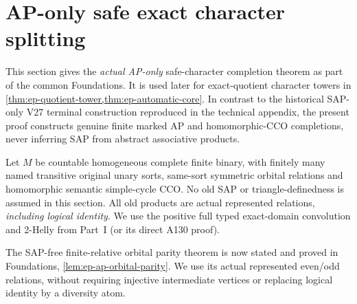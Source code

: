 \section{AP-only safe exact character splitting}
\label{sec:ep-ap-only-safe-character}

This section gives the \emph{actual AP-only} safe-character
completion theorem as part of the common Foundations.
It is used later for exact-quotient character towers in
\cref{thm:ep-quotient-tower,thm:ep-automatic-core}.
In contrast to the historical SAP-only V27 terminal
construction reproduced in the technical appendix,
the present proof constructs genuine finite marked
AP and homomorphic-CCO completions, never inferring
SAP from abstract associative products.

Let \(M\) be countable homogeneous complete finite binary,
with finitely many named transitive original unary sorts,
same-sort symmetric orbital relations and homomorphic
semantic simple-cycle CCO. No old SAP or
triangle-definedness is assumed in this section.
All old products are actual represented relations,
\emph{including logical identity}. We use the positive
full typed exact-domain convolution and 2-Helly
from Part~I (or its direct A130 proof).

The SAP-free finite-relative orbital parity theorem is now stated and
proved in Foundations, \cref{lem:ep-ap-orbital-parity}. We use its actual
represented even/odd relations, without requiring injective intermediate
vertices or replacing logical identity by a diversity atom.

